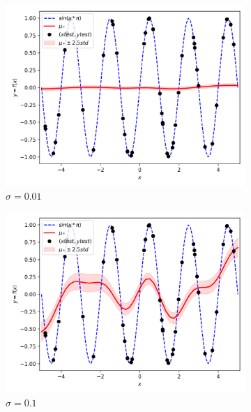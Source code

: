 \documentclass{article}
\begin{document}
\begin{figure}[ht]
  \begin{subfigure}{.33\textwidth}
    \centering
    \includegraphics[width=\linewidth]{kernelSE/s/0_01.png}
    \caption{$\sigma = 0.01$}
    \label{fig:s001}
  \end{subfigure}
  \begin{subfigure}{.33\textwidth}
    \centering
    \includegraphics[width=\linewidth]{kernelSE/s/0_1.png}
    \caption{$\sigma = 0.1$}
    \label{fig:s01}
  \end{subfigure}
  \begin{subfigure}{.33\textwidth}
    \centering

\end{subfigure}
\end{figure}
\end{document}

